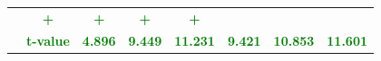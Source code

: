 \documentclass[11pt,english,a4paper,hidelinks]{book}
\begin{document}
\begin{table}[H]
\begin{tabular}{lccccccc}
                     & \textbf{\textcolor{green}{+}}
                     & \textbf{\textcolor{green}{+}}
                     & \textbf{\textcolor{green}{+}}
                     & \textbf{\textcolor{green}{+}} \\
            & \textbf{\textcolor{green}{t-value}}
                     & \textbf{\textcolor{green}{4.896}}
                     & \textbf{\textcolor{green}{9.449}}
                     & \textbf{\textcolor{green}{11.231}}
                     & \textbf{\textcolor{green}{9.421}}
                     & \textbf{\textcolor{green}{10.853}}
                     & \textbf{\textcolor{green}{11.601}} \\
        \bottomrule
    \end{tabular}
    \label{tab:asia_oceania_dividend_consistency}
\end{table}
\end{document}
